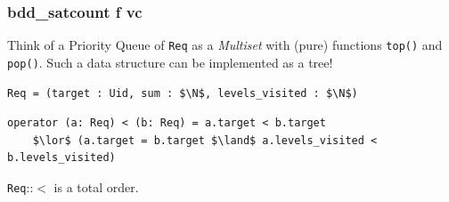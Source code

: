 \documentclass[english, aspectratio=169]{beamer}
\begin{document}
\begin{frame}[t, fragile]
  \frametitle{bdd\_satcount f vc}

  Think of a Priority Queue of \texttt{Req} as a \emph{Multiset} with (pure) functions
  \texttt{top()} and \texttt{pop()}. Such a data structure can be implemented as a tree!

  \begin{lstlisting}
Req = (target : Uid, sum : $\N$, levels_visited : $\N$)
  \end{lstlisting}
  \begin{lstlisting}[firstnumber=2]
operator (a: Req) < (b: Req) = a.target < b.target
    $\lor$ (a.target = b.target $\land$ a.levels_visited < b.levels_visited)
  \end{lstlisting}

  \begin{lemma}
    \texttt{Req}::$<$ is a total order.
  \end{lemma}
\end{frame}
\end{document}
